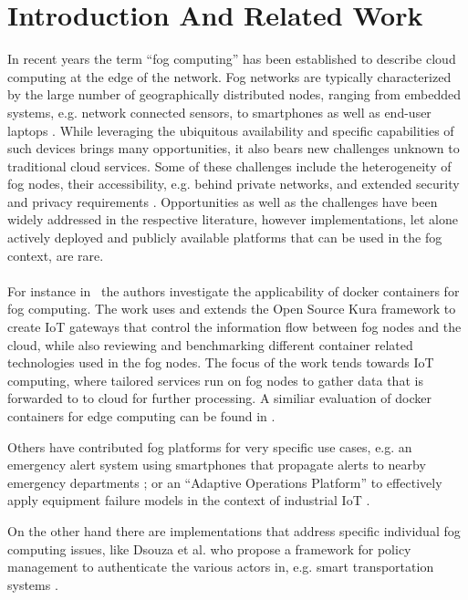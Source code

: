 \section{Introduction And Related Work}

In recent years the term ``fog computing'' has been established to describe
cloud computing at the edge of the network. Fog networks are typically
characterized by the large number of geographically distributed nodes, ranging
from embedded systems, e.g. network connected
sensors, to smartphones as well as end-user laptops
\cite{Bonomi:2012:FCR:2342509.2342513,Yi:2015:SFC:2757384.2757397}.
While leveraging the
ubiquitous availability and specific capabilities of such devices brings
many opportunities, it also bears new challenges unknown to traditional cloud
services. Some of these challenges include the heterogeneity of fog nodes,
their accessibility, e.g. behind private networks, and extended security and
privacy requirements \cite{botta_integration_2016}.
Opportunities as well as the challenges have been widely addressed in the
respective literature, however implementations, let alone actively deployed and
publicly available platforms that can be used in the fog context, are rare. \\ \\

For instance in~\cite{bellavista_feasibility_2017} the authors investigate the
applicability of docker containers for fog computing. The work uses and extends
the Open Source Kura framework to create IoT gateways that control the information
flow between fog nodes and the cloud, while also reviewing and benchmarking
different container related technologies used in the fog nodes.
The focus of the work tends towards IoT computing, where tailored services run
on fog nodes to gather data that is forwarded to to cloud for further processing.
A similiar evaluation of docker containers for edge computing can be found in
\cite{ismail_evaluation_2015}.

Others have contributed fog platforms for very specific use cases, e.g.
an emergency alert system using smartphones that propagate alerts to nearby
emergency departments \cite{7134091}; or an ``Adaptive Operations Platform''
to effectively apply equipment failure models in the context of industrial
IoT \cite{gazis_components_2015}.

On the other hand there are implementations that address specific individual
fog computing issues, like Dsouza et al. who propose a framework for
policy management to authenticate the various actors in, e.g. smart
transportation systems \cite{dsouza_policy-driven_2014}.

